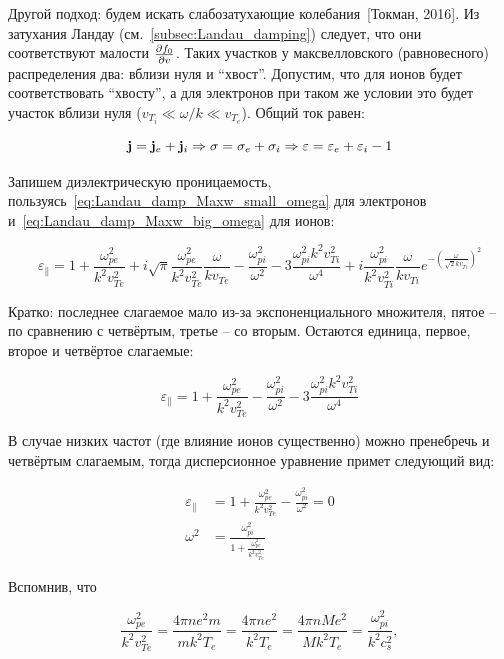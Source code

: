 \documentclass[10pt, a4paper]{article}
\newcommand{\Tokman}{~[Токман, 2016]}
\begin{document}
Другой подход: будем искать слабозатухающие колебания\Tokman. Из затухания Ландау (см.~\ref{subsec:Landau_damping}) следует, что они соответствуют малости $\pdv{f_0}{v}$. Таких участков у максвелловского (равновесного) распределения два: вблизи нуля и ``хвост''. Допустим, что для ионов будет соответствовать ``хвосту'', а для электронов при таком же условии это будет участок вблизи нуля ($v_{T_i} \ll \omega/k \ll v_{T_e}$). Общий ток равен:

\begin{equation*}
	\vb{j} = \vb{j}_e + \vb{j}_i \Rightarrow \sigma = \sigma_e + \sigma_i \Rightarrow \varepsilon = \varepsilon_e + \varepsilon_i - 1
\end{equation*}

Запишем диэлектрическую проницаемость, пользуясь~\eqref{eq:Landau_damp_Maxw_small_omega} для электронов и~\eqref{eq:Landau_damp_Maxw_big_omega} для ионов:

\begin{equation*}
	\varepsilon_\parallel = 1 + \frac{\omega_{pe}^2}{k^2v_{Te}^2} + i\sqrt{\pi} \frac{\omega_{pe}^2}{k^2v_{Te}^2}\frac{\omega}{kv_{Te}} - \frac{\omega_{pi}^2}{\omega^2}-3\frac{\omega_{pi}^2k^2v_{Ti}^2}{\omega^4} + i \frac{\omega_{pi}^2}{k^2v_{Ti}^2} \frac{\omega}{kv_{Ti} }e^{-\left(\frac{\omega}{\sqrt{2}kv_{Ti}}\right)^2}
\end{equation*}

Кратко: последнее слагаемое мало из-за экспоненциального множителя, пятое -- по сравнению с четвёртым, третье -- со вторым. Остаются единица, первое, второе и четвёртое слагаемые:

\begin{equation*}
	\varepsilon_\parallel = 1+\frac{\omega_{pe}^2}{k^2 v_{Te}^2} - \frac{\omega_{pi}^2}{\omega^2}-3\frac{\omega_{pi}^2k^2v_{Ti}^2}{\omega^4}
\end{equation*}

В случае низких частот (где влияние ионов существенно) можно пренебречь и четвёртым слагаемым, тогда дисперсионное уравнение примет следующий вид:

\begin{align*}
	\varepsilon_\parallel &= 1 + \frac{\omega_{pe}^2}{k^2 v_{Te}^2} - \frac{\omega_{pi}^2}{\omega^2} = 0 \\
	\omega^2 &= \frac{\omega_{pi}^2}{1 + \frac{\omega_{pe}^2}{k^2v_{Te}^2}}
\end{align*}

Вспомнив, что

\begin{equation*}
	\frac{\omega_{pe}^2}{k^2v_{Te}^2} = \frac{4\pi ne^2m}{mk^2T_e} = \frac{4\pi ne^2}{k^2T_e} = \frac{4\pi nMe^2}{Mk^2T_e} = \frac{\omega_{pi}^2}{k^2c_s^2},
\end{equation*}
\end{document}
